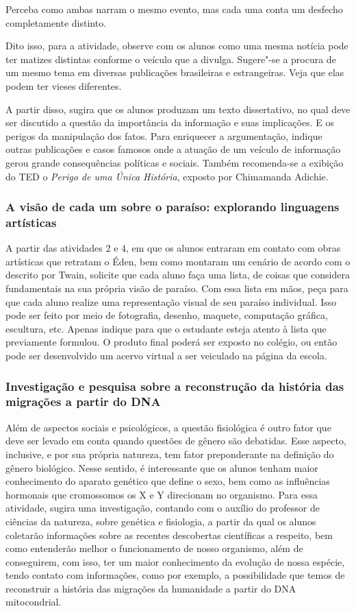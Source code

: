 \documentclass[12pt]{extarticle}
\begin{document}
Perceba como ambas narram o mesmo evento, mas cada uma conta um desfecho
completamente distinto.

Dito isso, para a atividade, observe com os alunos como uma mesma
notícia pode ter matizes distintas conforme o veículo que a divulga.
Sugere"-se a procura de um mesmo tema em diversas publicações brasileiras
e estrangeiras. Veja que elas podem ter vieses diferentes.

A partir disso, sugira que os alunos produzam um texto dissertativo, no
qual deve ser discutido a questão da importância da informação e suas
implicações. E os perigos da manipulação dos fatos. Para enriquecer a
argumentação, indique outras publicações e casos famosos onde a atuação
de um veículo de informação gerou grande consequências políticas e
sociais. Também recomenda-se a exibição do TED o \emph{Perigo de uma
Única História}, exposto por Chimamanda Adichie.

\subsubsection{A visão de cada um sobre o
paraíso: explorando linguagens artísticas}


A partir das atividades 2 e 4, em que os alunos entraram em contato
com obras artísticas que retratam o Éden, bem como montaram um cenário
de acordo com o descrito por Twain, solicite que cada aluno faça uma
lista, de coisas que considera fundamentais na sua própria visão de
paraíso. Com essa lista em mãos, peça para que cada aluno realize uma
representação visual de seu paraíso individual. Isso pode ser feito
por meio de fotografia, desenho, maquete, computação gráfica,
escultura, etc. Apenas indique para que o estudante esteja atento à
lista que previamente formulou. O produto final poderá ser exposto no
colégio, ou então pode ser desenvolvido um acervo virtual a ser
veiculado na página da escola.

\subsubsection{Investigação e pesquisa sobre a reconstrução da história das
migrações a partir do DNA}


Além de aspectos sociais e psicológicos, a questão fisiológica é outro
fator que deve ser levado em conta quando questões de gênero são
debatidas. Esse aspecto, inclusive, e por sua própria natureza, tem
fator preponderante na definição do gênero biológico. Nesse sentido, é
interessante que os alunos tenham maior conhecimento do aparato
genético que define o sexo, bem como as influências hormonais que
cromossomos os X e Y direcionam no organismo. Para essa atividade,
sugira uma investigação, contando com o auxílio do professor de
ciências da natureza, sobre genética e fisiologia, a partir da qual os
alunos coletarão informações sobre as recentes descobertas científicas
a respeito, bem como entenderão melhor o funcionamento de nosso
organismo, além de conseguirem, com isso, ter um maior conhecimento da
evolução de nossa espécie, tendo contato com informações, como por
exemplo, a possibilidade que temos de reconstruir a história das
migrações da humanidade a partir do DNA mitocondrial.
\end{document}
